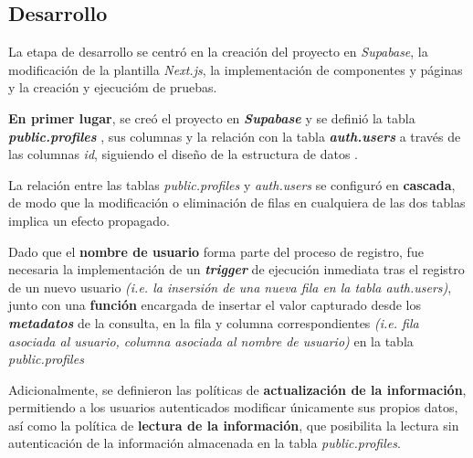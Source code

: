 \subsection{Desarrollo}
La etapa de desarrollo se centró en la creación del proyecto en \textit{Supabase}, la modificación de la plantilla \textit{Next.js}, la implementación de componentes y páginas y la creación y ejecucióm de pruebas.

\textbf{En primer lugar}, se creó el proyecto en \textbf{\textit{Supabase}} y se definió la tabla \textbf{\textit{public.profiles}} , sus columnas y la relación con la tabla \textbf{\textit{auth.users}} a través de las columnas \textit{id}, siguiendo el diseño de la estructura de datos .

La relación entre las tablas \textit{public.profiles} y \textit{auth.users} se configuró en \textbf{cascada}, de modo que la modificación o eliminación de filas en cualquiera de las dos tablas implica un efecto propagado.

Dado que el \textbf{nombre de usuario} forma parte del proceso de registro, fue necesaria la implementación de un \textbf{\textit{trigger}}  de ejecución inmediata tras el registro de un nuevo usuario \textit{(i.e. la insersión de una nueva fila en la tabla auth.users)}, junto con una \textbf{función}  encargada de insertar el valor capturado desde los \textbf{\textit{metadatos}} de la consulta, en la fila y columna correspondientes \textit{(i.e. fila asociada al usuario, columna asociada al nombre de usuario)} en la tabla \textit{public.profiles}

Adicionalmente, se definieron las políticas  de \textbf{actualización de la información}, permitiendo a los usuarios autenticados modificar únicamente sus propios datos, así como la política de \textbf{lectura de la información}, que posibilita la lectura sin autenticación de la información almacenada en la tabla \textit{public.profiles}.

